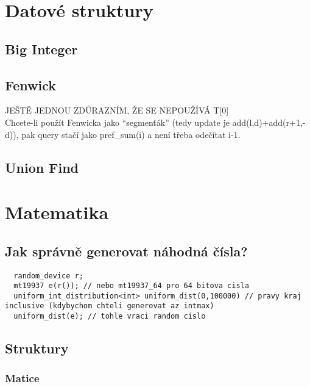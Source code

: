 \documentclass[10pt, a4paper, twoside]{article}
\begin{document}
\newpage

\section{Datové struktury}

\subsection{Big Integer}


\subsection{Fenwick}
JEŠTĚ JEDNOU ZDŮRAZNÍM, ŽE SE NEPOUŽÍVÁ T[0]\\
Chcete-li použít Fenwicka jako ``segmenťák'' (tedy update je add(l,d)+add(r+1,-d)), pak query stačí jako pref\_sum(i) a není třeba odečítat i-1.


\subsection{Union Find}


\newpage

\section{Matematika}

\subsection{Jak správně generovat náhodná čísla?}
\begin{lstlisting}
  random_device r;
  mt19937 e(r()); // nebo mt19937_64 pro 64 bitova cisla
  uniform_int_distribution<int> uniform_dist(0,100000) // pravy kraj inclusive (kdybychom chteli generovat az intmax)
  uniform_dist(e); // tohle vraci random cislo
\end{lstlisting}

\subsection{Struktury}
\subsubsection{Matice}

\end{document}
